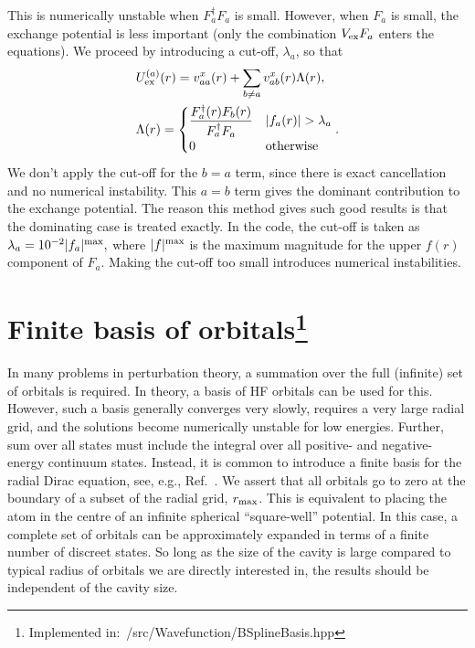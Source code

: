 \documentclass[10pt,twocolumn,a4paper]{article}%
\newcommand{\be}{\begin{equation}}
\newcommand{\ee}{\end{equation}}
\begin{document}
This is numerically unstable when $F_a^\dag F_a$ is small.
However, when $F_a$ is small, the exchange potential is less important (only the combination $V_{\rm ex}F_a$ enters the equations).
We proceed by introducing a cut-off, $\lambda_a$, so that
%
\begin{align}
& U^{(a)}_{\rm ex}(r) =
v^x_{aa}(r) + \sum_{b\neq a} v^x_{ab}(r) \Lambda(r),
\\
&\Lambda(r) =
\begin{cases}\dfrac{F_a^\dag(r) F_b(r)}{F_a^\dag F_a} & |f_a(r)|>\lambda_a\\
0&\mathrm{otherwise}
\end{cases}.
\end{align}
%
We don't apply the cut-off for the $b=a$ term, since there is exact cancellation and no numerical instability.
This $a=b$ term gives the dominant contribution to the exchange potential.
The reason this method gives such good results is that the dominating case is treated exactly.
%
In the code, the cut-off is taken as
$
\lambda_{a} = 10^{-2} |f_a|^{\rm max},
$
where  $|f|^{\rm max}$ is the maximum magnitude for the upper $f(r)$ component of $F_a$.
Making the cut-off too small introduces numerical instabilities.
%






\section[Finite basis of orbitals]{Finite basis of orbitals\label{sec:finite-basis}\footnote{Implemented in:~/src/Wavefunction/BSplineBasis.hpp}}

In many problems in perturbation theory, a summation over the full (infinite) set of orbitals is required.
In theory, a basis of HF orbitals can be used for this.
However, such a basis generally converges very slowly, requires a very large radial grid, and the solutions become numerically unstable for low energies.
Further, sum over all states must include the integral over all positive- and negative-energy continuum states.
%
Instead, it is common to introduce a finite basis for the radial Dirac equation, see, e.g., Ref.~\cite{Quiney1987,Johnson1988}.
%
We assert that all orbitals go to zero at the boundary of a subset of the radial grid, $r_{\rm max}$.
This is equivalent to placing the atom in the centre of an infinite spherical ``square-well'' potential.
In this case, a complete set of orbitals can be approximately expanded in terms of a finite number of discreet states.
So long as the size of the cavity is large compared to typical radius of orbitals we are directly interested in, the results should be independent of the cavity size.
\end{document}
